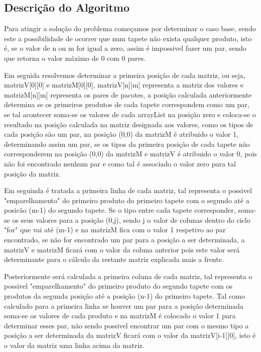 \documentclass[11pt]{article}
\begin{document}
\subsection{Descrição do Algoritmo}

\hspace{0,5cm}Para atingir a solução do problema começamos por determinar o caso base, sendo este a possibilidade de ocorrer que num tapete não exista qualquer produto, isto é, se o valor de n ou m for igual a zero, assim é impossivel fazer um par, sendo que retorna o valor máximo de 0 com 0 pares.

Em seguida resolvemos determinar a primeira posição de cada matriz, ou seja, matrizV[0][0] e matrizM[0][0], matrizV[n][m] representa a matriz dos valores e matrizM[n][m] representa os pares de pacotes, a posição calculada anteriormente determina se os primeiros produtos de cada tapete correspondem como um par, se tal acontecer soma-se os valores de cada arrayList na posição zero e coloca-se o resultado na posição calculada na matriz designada aos valores, como os tipos de cada posição são um par, na posição (0,0) da matrizM é atribuido o valor 1, determinando assim um par, se os tipos da primeira posição de cada tapete não corresponderem na posição (0,0) da matrizM e matrizV é atribuido o valor 0, pois não foi encontrado nenhum par e como tal é associado o valor zero para tal posição da matriz.

Em seguinda é tratada a primeira linha de cada matriz, tal representa o possivel "emparelhamento" do primeiro produto do primeiro tapete com o segundo até a posicão (m-1) do segundo tapete. Se o tipo entre cada tapete corresponder, soma-se os seus valores para a posição (0,j), sendo j o valor de colunas dentro do ciclo "for" que vai até (m-1) e na matrizM fica com o valor 1 respetivo ao par encontrado, se não for encontrado um par para a posição a ser determinada, a matrizV e matrizM ficará com o valor da coluna anterior pois este valor será determinante para o cálculo da restante matriz explicada mais a frente.

Posteriormente será calculada a primeira coluna de cada matriz, tal representa o possivel "emparelhamento" do primeiro produto do segundo tapete com os produtos da segunda posição até a posição (n-1) do primeiro tapete. Tal como calculado para a primeira linha se houver um par para a posição determinada soma-se os valores de cada produto e na matrizM é colocado o valor 1 para determinar esses par, não sendo possivel encontrar um par com o mesmo tipo a posição a ser determinada da matrizV ficará com o valor da matrizV[i-1][0], isto é o valor da matriz uma linha acima da matriz.
\end{document}
